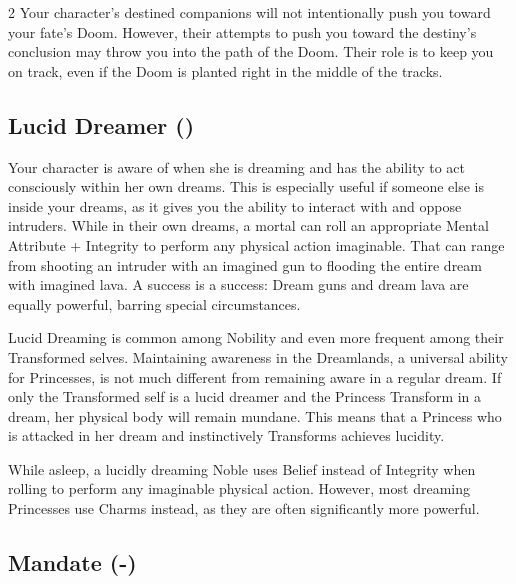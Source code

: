 \begin{multicols}{2}
Your character's destined companions will not intentionally push you toward your fate's Doom. However, their attempts to push you toward the destiny's conclusion may throw you into the path of the Doom. Their role is to keep you on track, even if the Doom is planted right in the middle of the tracks.


\subsection*{Lucid Dreamer (\textbullet\textbullet)}

Your character is aware of when she is dreaming and has the ability to act consciously within her own dreams. This is especially useful if someone else is inside your dreams, as it gives you the ability to interact with and oppose intruders. While in their own dreams, a mortal can roll an appropriate Mental Attribute + Integrity to perform any physical action imaginable. That can range from shooting an intruder with an imagined gun to flooding the entire dream with imagined lava. A success is a success: Dream guns and dream lava are equally powerful, barring special circumstances. 

Lucid Dreaming is common among Nobility and even more frequent among their Transformed selves. Maintaining awareness in the Dreamlands, a universal ability for Princesses, is not much different from remaining aware in a regular dream. If only the Transformed self is a lucid dreamer and the Princess Transform in a dream, her physical body will remain mundane. This means that a Princess who is attacked in her dream and instinctively Transforms achieves lucidity. 

While asleep, a lucidly dreaming Noble uses Belief instead of Integrity when rolling to perform any imaginable physical action. However, most dreaming Princesses use Charms instead, as they are often significantly more powerful.

\subsection*{Mandate (\textbullet\nobreak\hspace{.16667em}-\nobreak\hspace{.16667em}\textbullet\textbullet\textbullet)}


\end{multicols}
